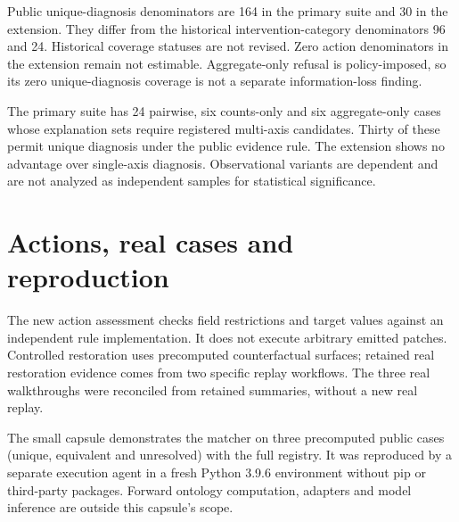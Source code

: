 \documentclass[11pt]{article}
\begin{document}
Public unique-diagnosis denominators are 164 in the primary suite and 30 in the
extension. They differ from the historical intervention-category denominators
96 and 24. Historical coverage statuses are not revised. Zero action denominators
in the extension remain not estimable. Aggregate-only refusal is policy-imposed,
so its zero unique-diagnosis coverage is not a separate information-loss finding.

The primary suite has 24 pairwise, six counts-only and six aggregate-only cases
whose explanation sets require registered multi-axis candidates. Thirty of these
permit unique diagnosis under the public evidence rule. The extension shows no
advantage over single-axis diagnosis. Observational variants are dependent and
are not analyzed as independent samples for statistical significance.

\section{Actions, real cases and reproduction}

The new action assessment checks field restrictions and target values against an
independent rule implementation. It does not execute arbitrary emitted patches.
Controlled restoration uses precomputed counterfactual surfaces; retained real
restoration evidence comes from two specific replay workflows. The three real
walkthroughs were reconciled from retained summaries, without a new real replay.

The small capsule demonstrates the matcher on three precomputed public cases
(unique, equivalent and unresolved) with the full registry. It was reproduced
by a separate execution agent in a fresh Python 3.9.6 environment without pip
or third-party packages. Forward ontology computation, adapters and model
inference are outside this capsule's scope.

\clearpage
\end{document}
